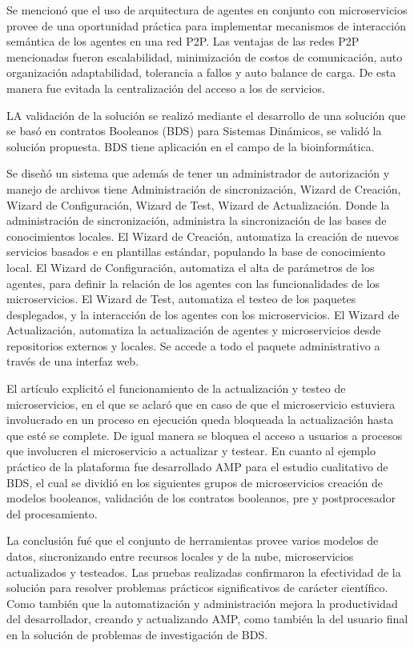 Se mencionó que el uso de arquitectura de agentes en conjunto con microservicios provee de una oportunidad práctica
para implementar mecanismos de interacción semántica de los agentes en una red P2P.
Las ventajas de las redes P2P mencionadas fueron escalabilidad, minimización de costos de comunicación,
auto organización adaptabilidad, tolerancia a fallos y auto balance de carga.
De esta manera fue evitada la centralización del acceso a los de servicios.\par

LA validación de la solución se realizó mediante el desarrollo de una solución que se basó en contratos Booleanos (BDS) para Sistemas Dinámicos,
se validó la solución propuesta.
BDS tiene aplicación en el campo de la bioinformática.\par

Se diseñó un sistema que además de tener un administrador de autorización y manejo de archivos tiene
Administración de sincronización, Wizard de Creación, Wizard de Configuración, Wizard de Test, Wizard de Actualización. Donde la administración de sincronización, administra la sincronización de las bases de conocimientos locales. El Wizard de Creación, automatiza la creación de nuevos servicios basados e en plantillas estándar,
populando la base de conocimiento local. El Wizard de Configuración, automatiza el alta de parámetros de los agentes,
para definir la relación de los agentes con las funcionalidades de los microservicios. El Wizard de Test, automatiza el testeo de los paquetes desplegados, y la interacción de los agentes con los microservicios. El Wizard de Actualización, automatiza la actualización de agentes y microservicios desde repositorios externos y locales.
Se accede a todo el paquete administrativo a través de una interfaz web.\par

El artículo explicitó el funcionamiento de la actualización y testeo de microservicios,
en el que se aclaró que en caso de que el microservicio estuviera involucrado
en un proceso en ejecución queda bloqueada la actualización hasta que esté se complete.
De igual manera se bloquea el acceso a usuarios a procesos que involucren el microservicio a actualizar y testear.
En cuanto al ejemplo práctico de la plataforma fue desarrollado AMP para el estudio cualitativo de BDS,
el cual se dividió en los siguientes grupos de microservicios creación de modelos booleanos, validación de los contratos booleanos, pre y postprocesador del procesamiento.\par

La conclusión fué que el conjunto de herramientas provee varios modelos de datos,
sincronizando entre recursos locales y de la nube, microservicios actualizados y testeados.
Las pruebas realizadas confirmaron la efectividad de la solución para resolver
problemas prácticos significativos de carácter científico. Como también que la automatización y administración
mejora la productividad del desarrollador, creando y actualizando AMP, como también la del usuario final en la
solución de problemas de investigación de BDS.\par
